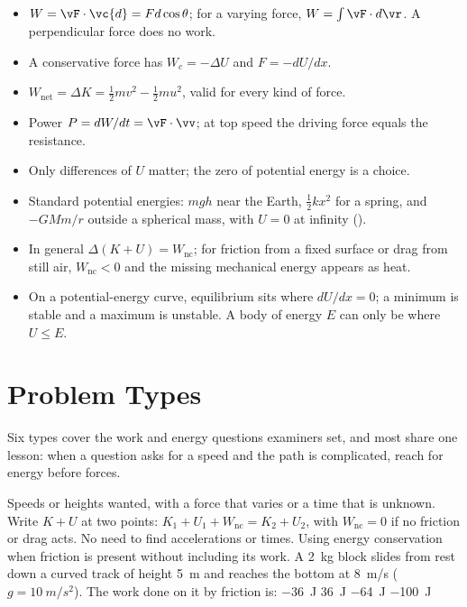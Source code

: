 \begin{itemize}
\item $W=\vF\cdot\vc{d}=Fd\cos\theta$; for a varying force, $W=\int\vF\cdot d\vr$. A perpendicular force
      does no work.
\item A conservative force has $W_c=-\Delta U$ and $F=-dU/dx$.
\item $W_{\text{net}}=\Delta K=\tfrac12mv^2-\tfrac12mu^2$, valid for every kind of force.
\item Power $P=dW/dt=\vF\cdot\vv$; at top speed the driving force equals the resistance.
\item Only differences of $U$ matter; the zero of potential energy is a choice.
\item Standard potential energies: $mgh$ near the Earth, $\tfrac12kx^2$ for a spring, and $-GMm/r$ outside a spherical
      mass, with $U=0$ at infinity ().
\item In general $\Delta(K+U)=W_{\text{nc}}$; for friction from a fixed surface or drag from still air,
      $W_{\text{nc}}<0$ and the missing mechanical energy appears as heat.
\item On a potential-energy curve, equilibrium sits where $dU/dx=0$; a minimum is stable and a maximum is
      unstable. A body of energy $E$ can only be where $U\le E$.
\end{itemize}

\section{Problem Types}\label{sec:types11}
Six types cover the work and energy questions examiners set, and most share one lesson: when a question
asks for a speed and the path is complicated, reach for energy before forces.

{Speeds or heights wanted, with a force that varies or a time that is unknown.}
{Write $K+U$ at two points: $K_1+U_1+W_{\text{nc}}=K_2+U_2$, with $W_{\text{nc}}=0$ if no friction or drag acts. No
need to find accelerations or times.}
{Using energy conservation when friction is present without including its work.}
{A \SI{2}{kg} block slides from rest down a curved track of height \SI{5}{m} and reaches the bottom at
\SI{8}{m/s} ($g=\SI{10}{m/s^2}$). The work done on it by friction is:}
{\SI{-36}{J}}
{\SI{+36}{J}}
{\SI{-64}{J}}
{\SI{-100}{J}}

